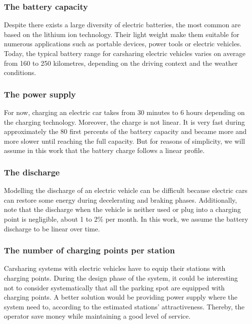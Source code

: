 \begin{bibunit}[ieeetr]
\subsubsection{The battery capacity}
Despite there exists a large diversity of electric batteries, the most common are based on the lithium ion technology.
Their light weight make them suitable for numerous applications such as portable devices, power tools or electric vehicles.
Today, the typical battery range for carsharing electric vehicles varies on average from 160 to 250 kilometres, depending on the driving context and the weather conditions.

\subsubsection{The power supply}
For now, charging an electric car takes from 30 minutes to 6 hours depending on the charging technology.
Moreover, the charge is not linear.
It is very fast during approximately the 80 first percents of the battery capacity and became more and more slower until reaching the full capacity.
But for reasons of simplicity, we will assume in this work that the battery charge follows a linear profile.


\subsubsection{The discharge}
Modelling the discharge of an electric vehicle can be difficult because electric cars can restore some energy during decelerating and braking phases.
Additionally, note that the discharge when the vehicle is neither used or plug into a charging point is negligible, about 1 to 2\% per month.
In this work, we assume the battery discharge to be linear over time.

\subsubsection{The number of charging points per station}
Carsharing systems with electric vehicles have to equip their stations with charging points.
During the design phase of the system, it could be interesting not to consider systematically that all the parking spot are equipped with charging points. 
A better solution would be providing power supply where the system need to, according to the estimated stations' attractiveness.
Thereby, the operator save money while maintaining a good level of service.


\end{bibunit}
